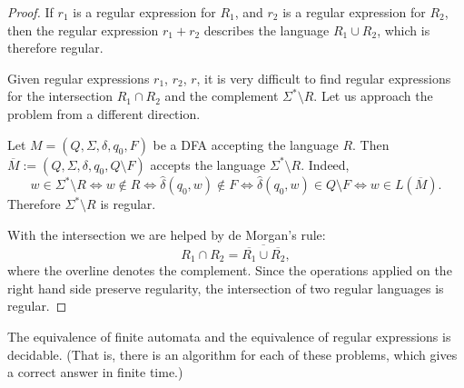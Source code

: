 \begin{page}
\setcounter{section}{3}
\setcounter{subsection}{1}
\setcounter{dfn}{1}
\label{portion:1114}

\begin{proof}
If $r_1$ is a regular expression for $R_1$, and $r_2$ is a regular expression for $R_2$,
then the regular expression $r_1 + r_2$ describes the language $R_1 \cup R_2$, which is therefore regular.

Given regular expressions $r_1$, $r_2$, $r$,
it is very difficult to find regular expressions for the intersection $R_1 \cap R_2$ and the complement $\Sigma^* \setminus R$.
Let us approach the problem from a different direction.

Let $M = (Q, \Sigma, \delta, q_0, F)$ be a DFA accepting the language $R$.
Then $\overline{M} := (Q, \Sigma, \delta, q_0, Q \setminus F)$ accepts the language $\Sigma^* \setminus R$.
Indeed,
\[
w \in \Sigma^* \setminus R \Leftrightarrow w \notin R \Leftrightarrow \widehat{\delta}(q_0, w) \notin F
\Leftrightarrow \widehat{\delta}(q_0, w) \in Q \setminus F \Leftrightarrow w \in L(\overline{M}).
\]
Therefore $\Sigma^* \setminus R$ is regular.

With the intersection we are helped by de Morgan's rule:
\[
R_1 \cap R_2 = \overline{\overline{R_1} \cup \overline{R_2}},
\]
where the overline denotes the complement.
Since the operations applied on the right hand side preserve regularity, the intersection of two regular languages is regular.
\end{proof}



\end{page}

\begin{page}
\setcounter{section}{3}
\setcounter{subsection}{1}
\setcounter{dfn}{2}
\label{portion:1116}

\begin{thm}
The equivalence of finite automata and the equivalence of regular expressions is decidable.
(That is, there is an algorithm for each of these problems, which gives a correct answer in finite time.)
\end{thm}

\end{page}

